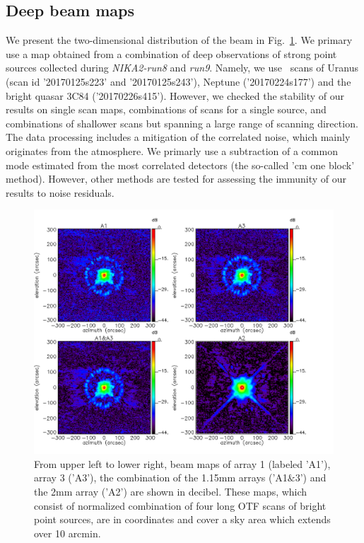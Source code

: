 \subsection{Deep beam maps}
\label{se:deep_beam_maps}
We present the two-dimensional distribution of the beam in
Fig.~\ref{fig:beam}. We primary use a map obtained from a combination
of deep observations of strong point sources collected during
\emph{NIKA2-run8} and \emph{run9}. Namely, we use \bm\ scans
of Uranus (scan id '20170125s223' and '20170125s243'),  Neptune
('20170224s177') and the bright quasar 3C84 ('20170226s415'). However,
we checked the stability of our results on single scan maps,
combinations of scans for a single source, and combinations of
shallower scans but spanning a large range of scanning direction. The
data processing includes a mitigation of the correlated noise, which
mainly originates from the atmosphere.  We primarly use a subtraction
of a common mode estimated from the most correlated detectors (the
so-called 'cm one block' method). However, other methods are tested
for assessing the immunity of our results to noise residuals.

\begin{figure}[ht!]
\begin{center}
  \includegraphics[clip, angle=0, scale=0.4]{Figures/Lobe_map_Combo_v2_dB.pdf}
 \caption[Beam pattern.]{From upper left to lower right, beam maps of array 1 (labeled 'A1'), array 3 ('A3'), the combination of the 1.15mm arrays ('A1$\&$3') and the 2mm array ('A2') are shown in decibel. These maps, which consist of normalized combination of four long OTF scans of bright point sources, are in  coordinates and cover a sky area which extends over 10 arcmin.}
\label{fig:beam}
\end{center}
\end{figure}


